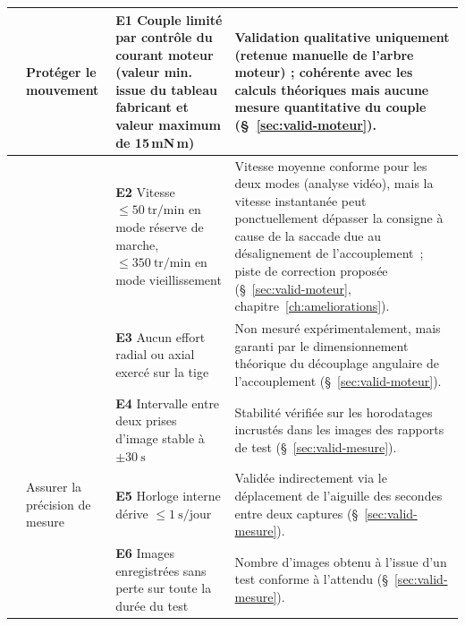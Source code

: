 \begin{landscape}
\begin{longtable}{|>{\raggedright\arraybackslash}p{1cm}|p{4.5cm}|p{7.5cm}|p{8cm}|}
\multirow{3}{*}{FC1} & \multirow{3}{4.5cm}{Protéger le mouvement}
    & \cellcolor{resPartiel}\rule[-0.4\baselineskip]{0pt}{1.8\baselineskip}\textbf{E1} Couple limité par contrôle du courant moteur (valeur min. issue du tableau fabricant et valeur maximum de 15\,mN\,m)
    & \rule[-0.4\baselineskip]{0pt}{1.8\baselineskip}Validation qualitative uniquement (retenue manuelle de l'arbre moteur) ; cohérente avec les calculs théoriques mais aucune mesure quantitative du couple (§~\ref{sec:valid-moteur}). \\
\cline{3-4}
 & & \cellcolor{resAFaire}\rule[-0.4\baselineskip]{0pt}{1.8\baselineskip}\textbf{E2} Vitesse $\leq 50\ \mathrm{tr/min}$ en mode réserve de marche, $\leq 350\ \mathrm{tr/min}$ en mode vieillissement
    & \rule[-0.4\baselineskip]{0pt}{1.8\baselineskip}Vitesse moyenne conforme pour les deux modes (analyse vidéo), mais la vitesse instantanée peut ponctuellement dépasser la consigne à cause de la saccade due au désalignement de l'accouplement~; piste de correction proposée (§~\ref{sec:valid-moteur}, chapitre~\ref{ch:ameliorations}). \\
\cline{3-4}
 & & \cellcolor{resPartiel}\rule[-0.4\baselineskip]{0pt}{1.8\baselineskip}\textbf{E3} Aucun effort radial ou axial exercé sur la tige
    & \rule[-0.4\baselineskip]{0pt}{1.8\baselineskip}Non mesuré expérimentalement, mais garanti par le dimensionnement théorique du découplage angulaire de l'accouplement (§~\ref{sec:valid-moteur}). \\
\hline

\multirow{3}{*}{FC2} & \multirow{3}{4.5cm}{Assurer la précision de mesure}
    & \cellcolor{resConforme}\rule[-0.4\baselineskip]{0pt}{1.8\baselineskip}\textbf{E4} Intervalle entre deux prises d'image stable à $\pm 30\ \mathrm{s}$
    & \rule[-0.4\baselineskip]{0pt}{1.8\baselineskip}Stabilité vérifiée sur les horodatages incrustés dans les images des rapports de test (§~\ref{sec:valid-mesure}). \\
\cline{3-4}
 & & \cellcolor{resConforme}\rule[-0.4\baselineskip]{0pt}{1.8\baselineskip}\textbf{E5} Horloge interne dérive $\leq 1\ \mathrm{s/jour}$
    & \rule[-0.4\baselineskip]{0pt}{1.8\baselineskip}Validée indirectement via le déplacement de l'aiguille des secondes entre deux captures (§~\ref{sec:valid-mesure}). \\
\cline{3-4}
 & & \cellcolor{resConforme}\rule[-0.4\baselineskip]{0pt}{1.8\baselineskip}\textbf{E6} Images enregistrées sans perte sur toute la durée du test
    & \rule[-0.4\baselineskip]{0pt}{1.8\baselineskip}Nombre d'images obtenu à l'issue d'un test conforme à l'attendu (§~\ref{sec:valid-mesure}). \\
\hline


\end{longtable}
\end{landscape}

